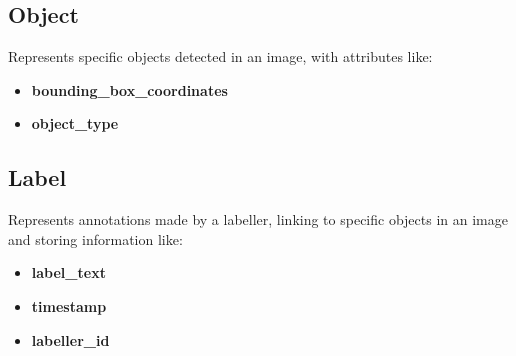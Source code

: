 \documentclass[12pt, titlepage]{article}
\begin{document}
\subsection*{Object}
Represents specific objects detected in an image, with attributes like:
\begin{itemize}
    \item \textbf{bounding\_box\_coordinates}
    \item \textbf{object\_type}
\end{itemize}

\subsection*{Label}
Represents annotations made by a labeller, linking to specific objects in an image and storing information like:
\begin{itemize}
    \item \textbf{label\_text}
    \item \textbf{timestamp}
    \item \textbf{labeller\_id}
\end{itemize}
\end{document}
